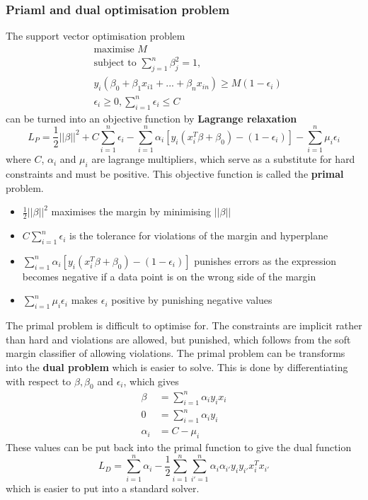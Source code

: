 \documentclass[CS5104-Notes.tex]{subfiles}
\begin{document}
\subsubsection{Priaml and dual optimisation problem}
The support vector optimisation problem
\begin{align*}
  &\text{maximise } M \\
  &\text{subject to } \sum_{j=1}^{n}\beta_{j}^{2} = 1, \\
  &y_{i}(\beta_{0} + \beta_{1}x_{i1} + ... + \beta_{n}x_{in}) \geq M(1 - \epsilon_{i}) \\
  &\epsilon_{i} \geq 0, \sum_{i=1}^{n}\epsilon_{i} \leq C
\end{align*}
can be turned into an objective function by \textbf{Lagrange relaxation}
\begin{equation}
  L_{P} = \frac{1}{2}||\beta||^{2} + C\sum_{i=1}^{n}\epsilon_{i}
  - \sum_{i=1}^{n}\alpha_{i}[y_{i}(x_{i}^{T}\beta + \beta_{0}) - (1 - \epsilon_{i})]
  - \sum_{i=1}^{n}\mu_{i}\epsilon_{i}
\end{equation}
where $C$, $\alpha_{i}$ and $\mu_{i}$ are lagrange multipliers, which serve as a substitute for hard constraints and must be positive. This objective function is called the \textbf{primal} problem.
\begin{itemize}
\item $\frac{1}{2}||\beta||^{2}$ maximises the margin by minimising $||\beta||$
\item $C\sum_{i=1}^{n}\epsilon_{i}$ is the tolerance for violations of the margin and hyperplane
\item $\sum_{i=1}^{n}\alpha_{i}[y_{i}(x_{i}^{T}\beta + \beta_{0}) - (1 - \epsilon_{i})]$ punishes errors as the expression becomes negative if a data point is on the wrong side of the margin
\item $\sum_{i=1}^{n}\mu_{i}\epsilon_{i}$ makes $\epsilon_{i}$ positive by punishing negative values
\end{itemize}
The primal problem is difficult to optimise for. The constraints are implicit rather than hard and violations are allowed, but punished, which follows from the soft margin classifier of allowing violations. The primal problem can be transforms into the \textbf{dual problem} which is easier to solve. This is done by differentiating with respect to $\beta, \beta_{0}$ and $\epsilon_{i}$, which gives
\begin{align}
  \beta &= \sum_{i=1}^{n}\alpha_{i}y_{i}x_{i} \\
  0 &= \sum_{i=1}^{n}\alpha_{i}y_{i} \\
  \alpha_{i} &= C - \mu_{i}
\end{align}
These values can be put back into the primal function to give the dual function
\begin{equation}
L_{D} = \sum_{i=1}^{n}\alpha_{i} - \frac{1}{2}\sum_{i=1}^{n}\sum_{i'=1}^{n}\alpha_{i}\alpha_{i'}y_{i}y_{i'}x_{i}^{T}x_{i'}
\end{equation}
which is easier to put into a standard solver.
\end{document}
